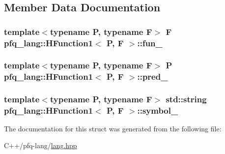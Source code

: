 \subsection{Member Data Documentation}
\hypertarget{structpfq__lang_1_1HFunction1_a24ea2e91b39b0eb547df29785b9a440c}{
\subsubsection[{fun\+\_\+}]{\setlength{\rightskip}{0pt plus 5cm}template$<$typename P, typename F$>$ F {\bf pfq\+\_\+lang\+::\+H\+Function1}$<$ P, F $>$\+::fun\+\_\+}}\label{structpfq__lang_1_1HFunction1_a24ea2e91b39b0eb547df29785b9a440c}
\hypertarget{structpfq__lang_1_1HFunction1_a2b27dcdb7b9183f330438e650a36aa42}{
\subsubsection[{pred\+\_\+}]{\setlength{\rightskip}{0pt plus 5cm}template$<$typename P, typename F$>$ P {\bf pfq\+\_\+lang\+::\+H\+Function1}$<$ P, F $>$\+::pred\+\_\+}}\label{structpfq__lang_1_1HFunction1_a2b27dcdb7b9183f330438e650a36aa42}
\hypertarget{structpfq__lang_1_1HFunction1_a887acb41567eabcdf4bc02d04b5250ea}{
\subsubsection[{symbol\+\_\+}]{\setlength{\rightskip}{0pt plus 5cm}template$<$typename P, typename F$>$ std\+::string {\bf pfq\+\_\+lang\+::\+H\+Function1}$<$ P, F $>$\+::symbol\+\_\+}}\label{structpfq__lang_1_1HFunction1_a887acb41567eabcdf4bc02d04b5250ea}


The documentation for this struct was generated from the following file\+:\begin{DoxyCompactItemize}
\item 
C++/pfq-\/lang/\hyperlink{lang_8hpp}{lang.\+hpp}\end{DoxyCompactItemize}
